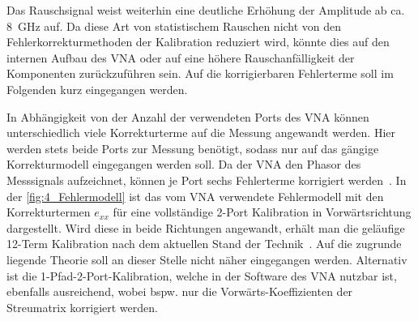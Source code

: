 Das Rauschsignal weist weiterhin eine deutliche Erhöhung der Amplitude ab ca. \SI{8}{\giga\hertz} auf. Da diese Art von statistischem Rauschen nicht von den Fehlerkorrekturmethoden der Kalibration reduziert wird, könnte dies auf den internen Aufbau des VNA oder auf eine höhere Rauschanfälligkeit der Komponenten zurückzuführen sein. Auf die korrigierbaren Fehlerterme soll im Folgenden kurz eingegangen werden.
\par
\vspace{\linespace}
In Abhängigkeit von der Anzahl der verwendeten Ports des VNA können unterschiedlich viele Korrekturterme auf die Messung angewandt werden. Hier werden stets beide Ports zur Messung benötigt, sodass nur auf das gängige Korrekturmodell eingegangen werden soll. Da der VNA den Phasor des Messsignals aufzeichnet, können je Port sechs Fehlerterme korrigiert werden~\cite{VNA-Handbuch}. In der \Abb\ref{fig:4_Fehlermodell} ist das vom VNA verwendete Fehlermodell mit den Korrekturtermen $e_{xx}$ für eine vollständige 2-Port Kalibration in Vorwärtsrichtung dargestellt. Wird diese in beide Richtungen angewandt, erhält man die geläufige \mbox{12-Term} Kalibration nach dem aktuellen Stand der Technik~\cite{VNA_Error_Models_and_Calibration_Methods}. Auf die zugrunde liegende Theorie soll an dieser Stelle nicht näher eingegangen werden. Alternativ ist die 1-Pfad-2-Port-Kalibration, welche in der Software des VNA nutzbar ist, ebenfalls ausreichend, wobei bspw. nur die Vorwärts-Koeffizienten der Streumatrix korrigiert werden. 
\par
\vspace{\linespace}


